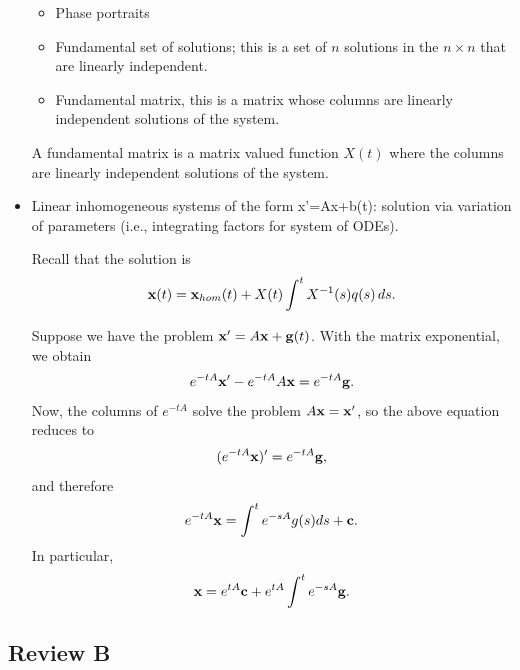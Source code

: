 \documentclass{article}
\begin{document}
\begin{itemize}
\begin{itemize}
      \item Phase portraits 
      \item Fundamental set of solutions; this is a set of $n$ solutions in the $n \times n$ that are linearly independent. 
      \item Fundamental matrix, this is a matrix whose columns are linearly independent solutions of the system.
    \end{itemize}

    A fundamental matrix is a matrix valued function $X(t)$ where the columns are linearly independent solutions of the system.


  \item  Linear inhomogeneous systems of the form x'=Ax+b(t): solution via variation of parameters (i.e., integrating factors for system of ODEs).

    Recall that the solution is
    \begin{align*}
      \mathbf{x}(t) = \mathbf{x}_{hom}(t) + X(t) \int^{t} X^{-1} (s) q(s) \, ds.
    \end{align*}

    Suppose we have the problem $\mathbf{x}' = A \mathbf{x} + \mathbf{g}(t)$.  With the matrix exponential, we obtain
    \begin{align*}
      e^{-tA} \mathbf{x}' - e^{-tA} A \mathbf{x} = e^{-tA} \mathbf{g}.
    \end{align*}
    Now, the columns of $e^{-tA}$ solve the problem $A \mathbf{x} = \mathbf{x}'$, so the above equation reduces to
    \begin{align*}
      (e^{-tA} \mathbf{x})' = e^{-tA} \mathbf{g},
    \end{align*}
    and therefore
    \begin{align*}
      e^{-tA} \mathbf{x} = \int^{t} e^{-sA} g(s) ds + \mathbf{c}.
    \end{align*}
    In particular,
    \begin{align*}
      \mathbf{x} = e^{tA} \mathbf{c} + e^{tA} \int^{t} e^{-sA} \mathbf{g}.
    \end{align*}
\end{itemize}

\subsection{Review B}
\end{document}
